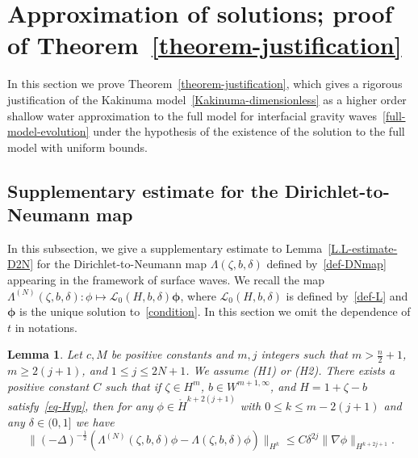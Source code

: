 \documentclass[11pt,leqno]{article}
\newtheorem{lemma}[theorem]{\bf Lemma}
\numberwithin{equation}{section}
\numberwithin{figure}{section}
\begin{document}
\section{Approximation of solutions; proof of Theorem~\ref{theorem-justification}}\label{S.convergence}
%
In this section we prove Theorem~\ref{theorem-justification}, which gives a rigorous justification of the Kakinuma model~\eqref{Kakinuma-dimensionless}
as a higher order shallow water approximation to the full model for interfacial gravity waves~\eqref{full-model-evolution}
under the hypothesis of the existence of the solution to the full model with uniform bounds. 


\subsection{Supplementary estimate for the Dirichlet-to-Neumann map}
%
In this subsection, we give a supplementary estimate to Lemma~\ref{L.L-estimate-D2N} for the Dirichlet-to-Neumann map 
$\Lambda(\zeta,b,\delta)$ defined by~\eqref{def-DNmap} appearing in the framework of surface waves. 
We recall the map $\Lambda^{(N)}(\zeta,b,\delta) \colon \phi \mapsto \mathcal{L}_0(H,b,\delta)\bm{\phi}$, 
where $\mathcal{L}_0(H,b,\delta)$ is defined by~\eqref{def-L} and $\bm{\phi}$ is the unique solution to~\eqref{condition}.
In this section we omit the dependence of $t$ in notations. 


\begin{lemma}\label{L.L-estimate-D2N-2}
Let $c, M$ be positive constants and $m, j$ integers such that $m>\frac{n}{2}+1$, $m\geq 2(j+1)$, and $1\leq j\leq 2N+1$. 
We assume {\rm (H1)} or {\rm (H2)}. 
There exists a positive constant $C$ such that if $\zeta\in H^m$, $b\in W^{m+1,\infty}$, and $H=1+\zeta-b$ satisfy~\eqref{eq-Hyp}, 
then for any $\phi\in\mathring{H}^{k+2(j+1)}$ with $0\leq k\leq m-2(j+1)$ and any $\delta\in(0,1]$ we have 
%
\[
\|(-\Delta)^{-\frac12}(\Lambda^{(N)}(\zeta,b,\delta)\phi-\Lambda(\zeta,b,\delta)\phi)\|_{H^k}
 \leq C \delta^{2j}\|\nabla \phi\|_{H^{k+2j+1}}.
\]
\end{lemma}
\end{document}
